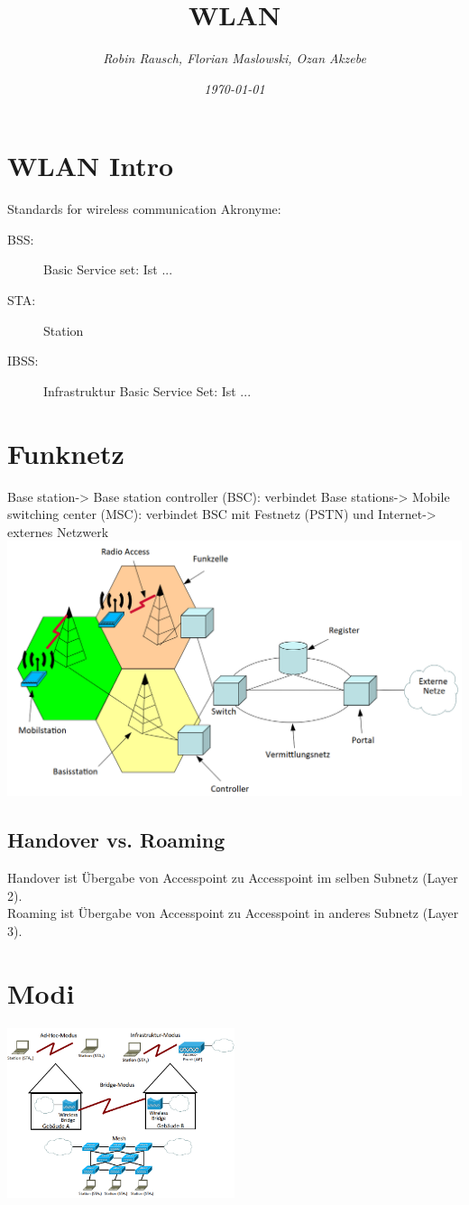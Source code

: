 \documentclass[12pt,a4paper]{article}
\author{\slshape Robin Rausch, Florian Maslowski, Ozan Akzebe}
\title{WLAN}
\date{\slshape \today}
\begin{document}
\maketitle
\tableofcontents
\newpage

\section{WLAN Intro}
	Standards for wireless communication
	Akronyme:
	\begin{description}
		\item[BSS:] Basic Service set: Ist ...
		\item[STA:] Station 
		\item[IBSS:] Infrastruktur Basic Service Set: Ist ... 
	\end{description}

\section{Funknetz}
	Base station-> Base station controller (BSC): verbindet Base stations-> Mobile switching center (MSC): verbindet BSC mit Festnetz (PSTN) und Internet-> externes Netzwerk
	\includegraphics[width=\textwidth]{Bilder/Funknetz.png}

	\subsection*{Handover vs. Roaming}
		Handover ist Übergabe von Accesspoint zu Accesspoint im selben Subnetz (Layer 2).\\
		Roaming ist Übergabe von Accesspoint zu Accesspoint in anderes Subnetz (Layer 3).
	
\section{Modi}
	\includegraphics[width=0.5\textwidth]{Bilder/Funkmodi.png}
\end{document}

